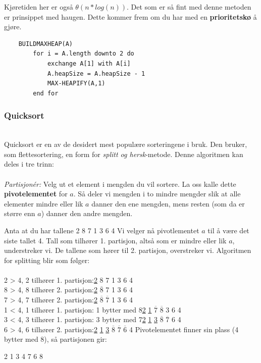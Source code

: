 \noindent Kjøretiden her er også \textbf{$\theta(n * log(n))$}. Det som er så fint med denne metoden er prinsippet med haugen. Dette kommer frem om du har med en \textbf{prioritetskø} å gjøre.

\begin{lstlisting}
    BUILDMAXHEAP(A)
        for i = A.length downto 2 do
	        exchange A[1] with A[i]
	        A.heapSize = A.heapSize - 1
	        MAX-HEAPIFY(A,1)
        end for
\end{lstlisting}

\subsubsection{Quicksort}\\
Quicksort er en av de desidert mest populære sorteringene i bruk. Den bruker, som flettesortering, en form for \textit{splitt og hersk}-metode. Denne algoritmen kan deles i tre trinn:
\\\\
\textit{Partisjonér:} Velg ut et element i mengden du vil sortere. La oss kalle dette \textbf{pivotelementet} for $a$. Så deler vi mengden i to mindre mengder slik at alle elementer mindre eller lik $a$ danner den ene mengden, mens resten (som da er større enn $a$) danner den andre mengden.

\begin{boxed}
Anta at du har tallene 2 8 7 1 3 6 4
\newline \newline
Vi velger nå pivotlementet $a$ til å være det siste tallet 4. Tall som tilhører 1. partisjon, altså som er mindre eller lik $a$, understreker vi. De tallene som hører til 2. partisjon, overstreker vi. Algoritmen for splitting blir som følger:
\\\\
2 > 4, 2 tilhører 1. partisjon:\hfill \underline{2} 8 7 1 3 6 4\\

8 > 4, 8 tilhører 2. partisjon:\hfill \underline{2} $\overline{8}$ 7 1 3 6 4\\

7 > 4, 7 tilhører 2. partisjon:\hfill \underline{2} $\overline{8}$ $\overline{7}$ 1 3 6 4\\

1 < 4, 1 tilhører 1. partisjon:  1 bytter med 8\hfill \underline{2} \underline{1} $\overline{7}$ $\overline{8}$ 3 6 4\\

3 < 4, 3 tilhører 1. partisjon: 3 bytter med 7\hfill \underline{2} \underline{1} \underline{3} $\overline{8}$ $\overline{7}$ 6 4\\

6 > 4, 6 tilhører 2. partisjon:\hfill \underline{2} \underline{1} \underline{3} $\overline{8}$ $\overline{7}$ $\overline{6}$ 4
\newline\newline
Pivotelementet finner sin plass (4 bytter med 8), så partisjonen gir:
\begin{center}
2 1 3 4 7 6 8
\end{center}
\end{boxed}

